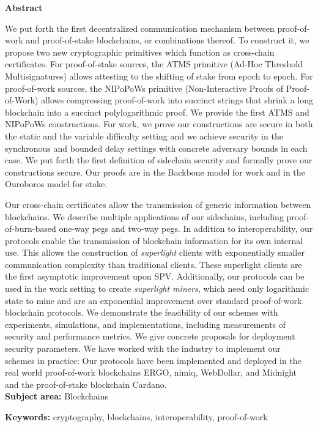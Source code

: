 \begin{center}%
  {\bfseries Abstract}%
\end{center}%

We put forth the first decentralized communication mechanism
between proof-of-work and proof-of-stake blockchains, or combinations thereof.
To construct it, we propose two new cryptographic primitives
which function as cross-chain certificates. For proof-of-stake sources, the ATMS
primitive (Ad-Hoc Threshold Multisignatures) allows attesting to the shifting of
stake from epoch to epoch. For proof-of-work sources, the NIPoPoWs primitive
(Non-Interactive Proofs of Proof-of-Work) allows compressing proof-of-work into
succinct strings that shrink a long blockchain into a succinct polylogarithmic
proof. We provide the first ATMS and NIPoPoWs constructions. For work, we prove
our constructions are secure in both the static and the variable difficulty
setting and we achieve security in the synchronous and bounded delay settings
with concrete adversary bounds in each case. We put forth the first definition
of sidechain security and formally prove our constructions secure. Our proofs
are in the Backbone model for work and in the Ouroboros model for stake.

Our cross-chain certificates allow the transmission of generic information
between blockchains. We describe multiple applications of our sidechains,
including proof-of-burn-based one-way pegs and two-way pegs.
In addition to interoperability, our protocols enable the transmission of
blockchain information for its own internal use. This allows the construction of
\emph{superlight} clients with exponentially smaller communication complexity
than traditional clients. These superlight clients are the first asymptotic
improvement upon SPV. Additionally, our protocols can be used in the work
setting to create \emph{superlight miners}, which need only logarithmic state
to mine and are an exponential improvement over standard proof-of-work
blockchain protocols. We demonstrate the feasibility of our schemes with
experiments, simulations, and implementations, including measurements of
security and performance metrics. We give concrete proposals for deployment
security parameters. We have worked with the industry to implement our schemes
in practice: Our protocols have been implemented and deployed in the real world
proof-of-work blockchains ERGO, nimiq, WebDollar, and Midnight and the
proof-of-stake blockchain Cardano.\\

\ifuniversity
\noindent
\textbf{Subject area:} Blockchains

\noindent
\textbf{Keywords:} cryptography, blockchains, interoperability, proof-of-work
\fi
